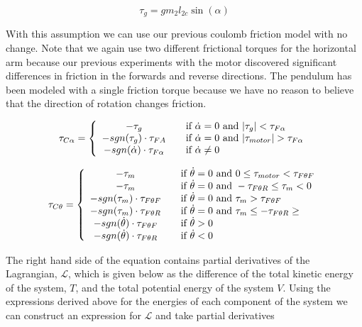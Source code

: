 \documentclass{article}
\theoremstyle{plain}
\theoremstyle{definition}
\theoremstyle{remark}
\newcommand{\Lagr}{\mathcal{L}}
\begin{document}
$$ \tau_g = g m_2 l_{2c} \sin(\alpha) $$  

With this assumption we can use our previous coulomb friction model with no change. Note that we again use two different frictional torques for the horizontal arm because our previous experiments with the motor discovered significant differences in friction in the forwards and reverse directions.  The pendulum has been modeled with a single friction torque because we have no reason to believe that the direction of rotation changes friction.  

\[
  \tau_{C \alpha} = \left\{
  \begin{array}{c l}
	 - \tau_{g} & \quad \text{if } \dot{\alpha} = 0 \text{ and } |\tau_{g}| < \tau_{F\alpha} \\
	- sgn(\tau_{g}) \cdot \tau_{FA} & \quad \text{if } \dot{\alpha} = 0 \text{ and } |\tau_{motor}| > \tau_{F\alpha} \\
	- sgn(\dot{\alpha}) \cdot \tau_{F\alpha} & \quad \text{if } \dot{\alpha} \neq 0 \\
  \end{array} \right.
\]

\[
  \tau_{C \theta} = \left\{
  \begin{array}{c l}
	 - \tau_{m} & \quad \text{if } \dot{\theta} = 0 \text{ and } 0 \leq \tau_{motor} < \tau_{F \theta F} \\
	- \tau_{m} & \quad \text{if } \dot{\theta} = 0 \text{ and } -\tau_{F \theta R} \leq \tau_{m} <  0\\
	- sgn(\tau_{m}) \cdot \tau_{F\theta F}& \quad \text{if } \dot{\theta} = 0 \text{ and } \tau_{m} > \tau_{F \theta F} \\
	- sgn(\tau_{m}) \cdot \tau_{F\theta R} & \quad \text{if } \dot{\theta} = 0 \text{ and } \tau_{m} \leq -\tau_{F \theta R} \geq \\
	- sgn(\dot{\theta}) \cdot \tau_{F \theta F} & \quad \text{if } \dot{\theta} > 0 \\
	- sgn(\dot{\theta}) \cdot \tau_{F \theta R} & \quad \text{if } \dot{\theta} < 0 \\
  \end{array} \right.
\]

The right hand side of the equation contains partial derivatives of the Lagrangian, $\Lagr$, which is given below as the difference of the total kinetic energy of the system, $T$, and the total potential energy of the system $V$.  Using the expressions derived above for the energies of each component of the system we can construct an expression for $\Lagr$ and take partial derivatives 
\end{document}
